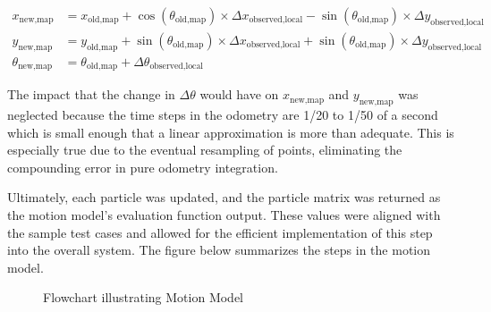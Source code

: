 \documentclass{article}
\begin{document}
\begin{align*}
    x_{\text{new,map}} &= x_{\text{old,map}} + \cos(\theta_{\text{old,map}}) \times \Delta x_{\text{observed,local}} - \sin(\theta_{\text{old,map}}) \times \Delta y_{\text{observed,local}} \\
    y_{\text{new,map}} &= y_{\text{old,map}} + \sin(\theta_{\text{old,map}}) \times \Delta x_{\text{observed,local}} + \sin(\theta_{\text{old,map}}) \times \Delta y_{\text{observed,local}} \\
    \theta_{\text{new,map}} &= \theta_{\text{old,map}} + \Delta \theta_{\text{observed,local}}
\end{align*}

The impact that the change in \(\Delta \theta\) would have on \(x_{\text{new,map}}\) and \(y_{\text{new,map}}\) was neglected because the time steps in the odometry are 1/20 to 1/50 of a second which is small enough that a linear approximation is more than adequate. This is especially true due to the eventual resampling of points, eliminating the compounding error in pure odometry integration.

Ultimately, each particle was updated, and the particle matrix was returned as the motion model's evaluation function output. These values were aligned with the sample test cases and allowed for the efficient implementation of this step into the overall system. The figure below summarizes the steps in the motion model. 
\vspace{1cm}

\begin{figure}[htbp]
    \centering
    \caption{Flowchart illustrating Motion Model}
    \label{fig:flowchart}
\end{figure}
\end{document}
